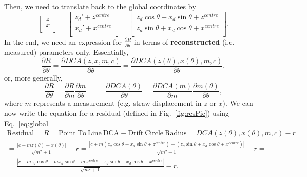 \documentclass[a4paper,11pt]{article}
\begin{document}
Then, we need to translate back to the global coordinates by
\begin{equation}
\begin{bmatrix}z\\x\\\end{bmatrix}=\begin{bmatrix}z_d'+z^{centre}\\x_d'+x^{centre}\\\end{bmatrix}=\begin{bmatrix}z_d\cos \theta -x_d\sin \theta + z^{centre} \\z_d\sin \theta +x_d\cos \theta + x^{centre} \\\end{bmatrix}. \label{eq:global}
\end{equation}
In the end, we need an expression for $\frac{\partial R}{\partial\theta}$ in terms of \textbf{reconstructed} (i.e. measured) parameters only. Essentially, 
\begin{equation}
\frac{\partial R}{\partial\theta} = \frac{\partial DCA(z,x,m,c)}{\partial\theta}= \frac{\partial DCA(z(\theta),x(\theta),m,c)}{\partial\theta},
\end{equation}
or, more generally, 
\begin{equation}
\frac{\partial R}{\partial\theta} = \frac{\partial R}{\partial m}\frac{\partial m}{\partial \theta} == \frac{\partial DCA(\theta)}{\partial\theta} = \frac{\partial DCA(m)}{\partial m}\frac{\partial m(\theta)}{\partial \theta},  \label{eq:partialRM}
\end{equation}
where $m$ represents a measurement (e.g. straw displacement in $z$ or $x$).
We can now write the equation for a residual (defined in Fig.~\ref{fig:resPic}) using Eq.~\ref{eq:global}
\begin{equation}
\begin{split}
\mathrm{Residual}= R =\mathrm{Point \ To \ Line \ DCA} - \mathrm{Drift \ Circle \ Radius} = DCA(z(\theta),x(\theta),m,c) - r = \\
= \frac{ |c+mz(\theta)-x(\theta)| }  { \sqrt{m^2+1} } -r = \frac{ |c+m(z_d\cos \theta -x_d\sin \theta + z^{centre})-(z_d\sin \theta +x_d\cos \theta + x^{centre})| }  { \sqrt{m^2+1} } -r=\\ = \frac{ |c+mz_d\cos \theta -mx_d\sin \theta + mz^{centre} -z_d\sin \theta - x_d\cos \theta - x^{centre}| }  { \sqrt{m^2+1} } -r.
\end{split}
\end{equation}
\end{document}
